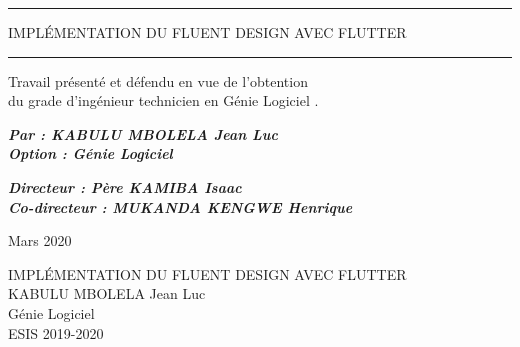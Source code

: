 \documentclass[a4paper,12pt]{report}
\begin{document}
\begin{titlepage}
        \vspace{15px}

        \begin{center}
            
            \rule[10pt]{\textwidth}{1pt}
            {\LARGE IMPLÉMENTATION DU FLUENT DESIGN AVEC FLUTTER }
            \bigskip
            \rule[10pt]{\textwidth}{1pt}
        \end{center}

        \begin{flushright}
            \small{
                Travail présenté et défendu en vue de l’obtention\\ du grade
            d’ingénieur technicien en Génie Logiciel .  
            }
            
        \end{flushright}

        \hspace{10pt}

        \begin{flushright}
            \textbf{\em{ {\small Par : KABULU MBOLELA Jean Luc}}}
            \\
            \textbf{\em{ \small{Option : Génie Logiciel }}}
        \end{flushright}
        \hspace{5pt}
        \begin{flushright}
            \textbf{\em{ {\small Directeur : Père KAMIBA Isaac }}}
            \\
            \textbf{\em{ \small{Co-directeur : MUKANDA KENGWE Henrique}}}
        \end{flushright}

        \vspace{30pt}
        \begin{center}
           {\large Mars 2020}
        \end{center}

    \end{titlepage}

    \newpage
    
    \begin{center}
        \Huge{IMPLÉMENTATION DU FLUENT DESIGN AVEC FLUTTER}
        \\
        \vspace{15pt}
        \large{KABULU MBOLELA Jean Luc}
        \\
        \vspace{10pt}
        \large{Génie Logiciel}
        \\
        \large{ESIS 2019-2020}
    \end{center}
\end{document}
